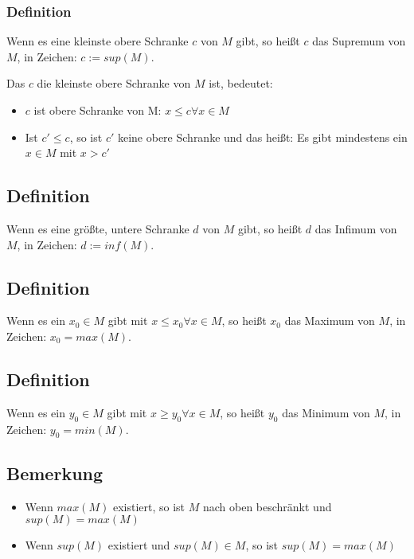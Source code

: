 \documentclass[a4paper,10pt]{article}
\begin{document}
\subsubsection{Definition}

Wenn es eine kleinste obere Schranke $c$ von $M$ gibt, so heißt $c$ das Supremum von $M$, in Zeichen: $c := sup(M)$.

Das $c$ die kleinste obere Schranke von $M$ ist, bedeutet:
\begin{itemize}
 \item $c$ ist obere Schranke von M: $x \le c \forall x \in M$
 \item Ist $c' \le c$, so ist $c'$ keine obere Schranke und das heißt: Es gibt mindestens ein $x \in M$ mit $x > c'$
\end{itemize}

\subsection{Definition}

Wenn es eine größte, untere Schranke $d$ von $M$ gibt, so heißt $d$ das Infimum von $M$, in Zeichen: $d := inf(M)$.

\subsection{Definition}

Wenn es ein $x_0 \in M$ gibt mit $x \le x_0 \forall x \in M$, so heißt $x_0$ das Maximum von $M$, in Zeichen: $x_0 = max(M)$.

\subsection{Definition}

Wenn es ein $y_0 \in M$ gibt mit $x \ge y_0 \forall x \in M$, so heißt $y_0$ das Minimum von $M$, in Zeichen: $y_0 = min(M)$.

\subsection{Bemerkung}

\begin{itemize}
 \item Wenn $max(M)$ existiert, so ist $M$ nach oben beschränkt und $sup(M) = max(M)$
 \item Wenn $sup(M)$ existiert und $sup(M) \in M$, so ist $sup(M) = max(M)$
\end{itemize}
\end{document}
